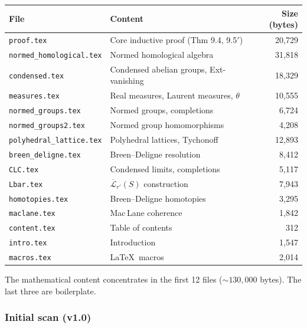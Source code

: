 \begin{center}
\small
\begin{tabular}{llr}
\toprule
\textbf{File} & \textbf{Content} & \textbf{Size (bytes)} \\
\midrule
\texttt{proof.tex}              & Core inductive proof (Thm 9.4, 9.5$'$) & 20{,}729 \\
\texttt{normed\_homological.tex} & Normed homological algebra             & 31{,}818 \\
\texttt{condensed.tex}          & Condensed abelian groups, Ext-vanishing & 18{,}329 \\
\texttt{measures.tex}           & Real measures, Laurent measures, $\theta$ & 10{,}555 \\
\texttt{normed\_groups.tex}     & Normed groups, completions              &  6{,}724 \\
\texttt{normed\_groups2.tex}    & Normed group homomorphisms              &  4{,}208 \\
\texttt{polyhedral\_lattice.tex} & Polyhedral lattices, Tychonoff         & 12{,}893 \\
\texttt{breen\_deligne.tex}     & Breen--Deligne resolution               &  8{,}412 \\
\texttt{CLC.tex}                & Condensed limits, completions           &  5{,}117 \\
\texttt{Lbar.tex}               & $\overline{\mathcal{L}}_{r'}(S)$ construction & 7{,}943 \\
\texttt{homotopies.tex}         & Breen--Deligne homotopies               &  3{,}295 \\
\texttt{maclane.tex}            & Mac\,Lane coherence                     &  1{,}842 \\
\texttt{content.tex}            & Table of contents                       &    312 \\
\texttt{intro.tex}              & Introduction                            &  1{,}547 \\
\texttt{macros.tex}             & \LaTeX\ macros                          &  2{,}014 \\
\bottomrule
\end{tabular}
\end{center}

The mathematical content concentrates in the first 12 files
(${\sim}130{,}000$ bytes).  The last three are boilerplate.


\subsubsection{Initial scan (v1.0)}\label{sec:initial-scan}

